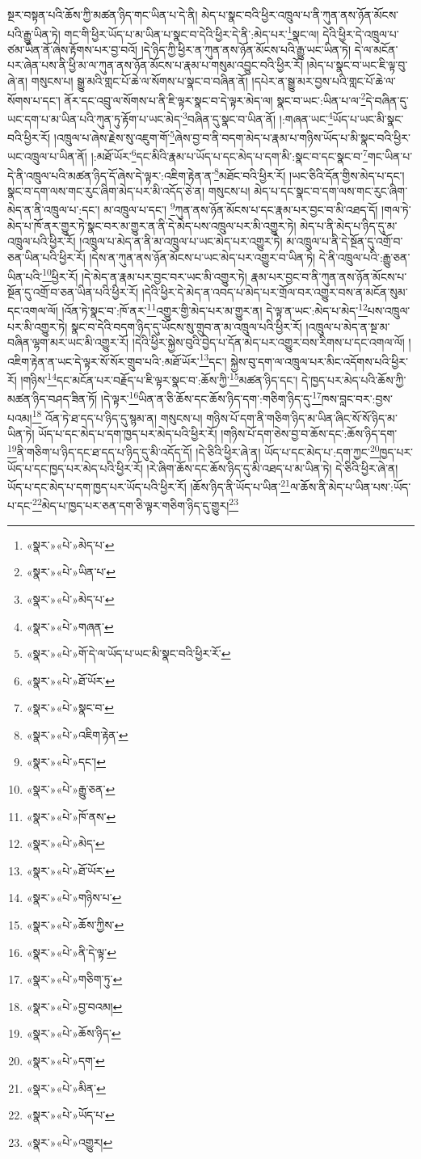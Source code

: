 སྔར་བསྟན་པའི་ཆོས་ཀྱི་མཚན་ཉིད་གང་ཡིན་པ་དེ་ནི། མེད་པ་སྣང་བའི་ཕྱིར་འཁྲུལ་པ་ནི་ཀུན་ནས་ཉོན་མོངས་པའི་རྒྱུ་ཡིན་ཏེ། གང་གི་ཕྱིར་ཡོད་པ་མ་ཡིན་པ་སྣང་བ་དེའི་ཕྱིར་དེ་ནི་:མེད་པར་\footnote{«སྣར་»«པེ་»མེད་པ་}སྣང་ལ། དེའི་ཕྱིར་དེ་འཁྲུལ་པ་ཙམ་ཡིན་ནོ་ཞེས་རྟོགས་པར་བྱ་བའོ། །དེ་ཉིད་ཀྱི་ཕྱིར་ན་ཀུན་ནས་ཉོན་མོངས་པའི་རྒྱུ་ཡང་ཡིན་ཏེ། དེ་ལ་མངོན་པར་ཞེན་པས་ནི་ཕྱི་མ་ལ་ཀུན་ནས་ཉོན་མོངས་པ་རྣམ་པ་གསུམ་འབྱུང་བའི་ཕྱིར་རོ། །མེད་པ་སྣང་བ་ཡང་ཇི་ལྟ་བུ་ཞེ་ན། གསུངས་པ། སྒྱུ་མའི་གླང་པོ་ཆེ་ལ་སོགས་པ་སྣང་བ་བཞིན་ནོ། །དཔེར་ན་སྒྱུ་མར་བྱས་པའི་གླང་པོ་ཆེ་ལ་སོགས་པ་དང་། ནོར་དང་འབྲུ་ལ་སོགས་པ་ནི་ཇི་ལྟར་སྣང་བ་དེ་ལྟར་མེད་ལ། སྣང་བ་ཡང་:ཡིན་པ་ལ་\footnote{«སྣར་»«པེ་»ཡིན་པ་}དེ་བཞིན་དུ་ཡང་དག་པ་མ་ཡིན་པའི་ཀུན་ཏུ་རྟོག་པ་ཡང་མེད་\footnote{«སྣར་»«པེ་»མེད་པ་}བཞིན་དུ་སྣང་བ་ཡིན་ནོ། །:གཞན་ཡང་\footnote{«སྣར་»«པེ་»གཞན་}ཡོད་པ་ཡང་མི་སྣང་བའི་ཕྱིར་རོ། །འཁྲུལ་པ་ཞེས་རྗེས་སུ་འཇུག་གོ་\footnote{«སྣར་»«པེ་»གོ་དེ་ལ་ཡོད་པ་ཡང་མི་སྣང་བའི་ཕྱིར་རོ་}ཞེས་བྱ་བ་ནི་བདག་མེད་པ་རྣམ་པ་གཉིས་ཡོད་པ་མི་སྣང་བའི་ཕྱིར་ཡང་འཁྲུལ་པ་ཡིན་ནོ། །:མཐོ་ཡོར་\footnote{«སྣར་»«པེ་»ཐོ་ཡོར་}དང་མིའི་རྣམ་པ་ཡོད་པ་དང་མེད་པ་དག་མི་:སྣང་བ་དང་སྣང་བ་\footnote{«སྣར་»«པེ་»སྣང་བ་}གང་ཡིན་པ་དེ་ནི་འཁྲུལ་པའི་མཚན་ཉིད་དོ་ཞེས་དེ་ལྟར་:འཇིག་རྟེན་ན་\footnote{«སྣར་»«པེ་»འཇིག་རྟེན་}མཐོང་བའི་ཕྱིར་རོ། །ཡང་ཅིའི་དོན་གྱིས་མེད་པ་དང་། སྣང་བ་དག་ལས་གང་རུང་ཞིག་མེད་པར་མི་འདོད་ཅེ་ན། གསུངས་པ། མེད་པ་དང་སྣང་བ་དག་ལས་གང་རུང་ཞིག་མེད་ན་ནི་འཁྲུལ་པ་:དང་། མ་འཁྲུལ་པ་དང་། \footnote{«སྣར་»«པེ་»དང་།  }ཀུན་ནས་ཉོན་མོངས་པ་དང་རྣམ་པར་བྱང་བ་མི་འཐད་དོ། །གལ་ཏེ་མེད་པ་ཁོ་ནར་གྱུར་ཏེ་སྣང་བར་མ་གྱུར་ན་ནི་དེ་མེད་པས་འཁྲུལ་པར་མི་འགྱུར་ཏེ། མེད་པ་ནི་མེད་པ་ཉིད་དུ་མ་འཁྲུལ་པའི་ཕྱིར་རོ། །འཁྲུལ་པ་མེད་ན་ནི་མ་འཁྲུལ་པ་ཡང་མེད་པར་འགྱུར་ཏེ། མ་འཁྲུལ་པ་ནི་དེ་སྔོན་དུ་འགྲོ་བ་ཅན་ཡིན་པའི་ཕྱིར་རོ། །དེས་ན་ཀུན་ནས་ཉོན་མོངས་པ་ཡང་མེད་པར་འགྱུར་བ་ཡིན་ཏེ། དེ་ནི་འཁྲུལ་པའི་:རྒྱུ་ཅན་ཡིན་པའི་\footnote{«སྣར་»«པེ་»རྒྱུ་ཅན་}ཕྱིར་རོ། །དེ་མེད་ན་རྣམ་པར་བྱང་བར་ཡང་མི་འགྱུར་ཏེ། རྣམ་པར་བྱང་བ་ནི་ཀུན་ནས་ཉོན་མོངས་པ་སྔོན་དུ་འགྲོ་བ་ཅན་ཡིན་པའི་ཕྱིར་རོ། །དེའི་ཕྱིར་དེ་མེད་ན་འབད་པ་མེད་པར་གྲོལ་བར་འགྱུར་བས་ན་མངོན་སུམ་དང་འགལ་ལོ། །འོན་ཏེ་སྣང་བ་:ཁོ་ནར་\footnote{«སྣར་»«པེ་»ཁོ་ནས་}འགྱུར་གྱི་མེད་པར་མ་གྱུར་ན། དེ་ལྟ་ན་ཡང་:མེད་པ་མེད་\footnote{«སྣར་»«པེ་»མེད་}པས་འཁྲུལ་པར་མི་འགྱུར་ཏེ། སྣང་བ་དེའི་བདག་ཉིད་དུ་ཡོངས་སུ་གྲུབ་ན་མ་འཁྲུལ་པའི་ཕྱིར་རོ། །འཁྲུལ་པ་མེད་ན་སྔ་མ་བཞིན་ལྷག་མར་ཡང་མི་འགྱུར་རོ། །དེའི་ཕྱིར་སྐྱེས་བུའི་བྱེད་པ་དོན་མེད་པར་འགྱུར་བས་རིགས་པ་དང་འགལ་ལོ། །འཇིག་རྟེན་ན་ཡང་དེ་ལྟར་སོ་སོར་གྲུབ་པའི་:མཐོ་ཡོར་\footnote{«སྣར་»«པེ་»ཐོ་ཡོར་}དང་། སྐྱེས་བུ་དག་ལ་འཁྲུལ་པར་མིང་འདོགས་པའི་ཕྱིར་རོ། །གཉིས་\footnote{«སྣར་»«པེ་»གཉིས་པ་}དང་མངོན་པར་བརྗོད་པ་ཇི་ལྟར་སྣང་བ་:ཆོས་ཀྱི་\footnote{«སྣར་»«པེ་»ཆོས་ཀྱིས་}མཚན་ཉིད་དང་། དེ་ཁྱད་པར་མེད་པའི་ཆོས་ཀྱི་མཚན་ཉིད་བཤད་ཟིན་ཏོ། །དེ་ལྟར་\footnote{«སྣར་»«པེ་»ནི་དེ་ལྟ་}ཡིན་ན་ཅི་ཆོས་དང་ཆོས་ཉིད་དག་:གཅིག་ཉིད་དུ་\footnote{«སྣར་»«པེ་»གཅིག་ཏུ་}ཁས་བླང་བར་:བྱས་པའམ།\footnote{«སྣར་»«པེ་»བྱ་བའམ།} འོན་ཏེ་ཐ་དད་པ་ཉིད་དུ་སྙམ་ན། གསུངས་པ། གཉིས་པོ་དག་ནི་གཅིག་ཉིད་མ་ཡིན་ཞིང་སོ་སོ་ཉིད་མ་ཡིན་ཏེ། ཡོད་པ་དང་མེད་པ་དག་ཁྱད་པར་མེད་པའི་ཕྱིར་རོ། །གཉིས་པོ་དག་ཅེས་བྱ་བ་ཆོས་དང་:ཆོས་ཉིད་དག་\footnote{«སྣར་»«པེ་»ཆོས་ཉིད་}ནི་གཅིག་པ་ཉིད་དང་ཐ་དད་པ་ཉིད་དུ་མི་འདོད་དོ། །དེ་ཅིའི་ཕྱིར་ཞེ་ན། ཡོད་པ་དང་མེད་པ་:དག་ཀྱང་\footnote{«སྣར་»«པེ་»དག་}ཁྱད་པར་ཡོད་པ་དང་ཁྱད་པར་མེད་པའི་ཕྱིར་རོ། །རེ་ཞིག་ཆོས་དང་ཆོས་ཉིད་དུ་མི་འཐད་པ་མ་ཡིན་ཏེ། དེ་ཅིའི་ཕྱིར་ཞེ་ན། ཡོད་པ་དང་མེད་པ་དག་ཁྱད་པར་ཡོད་པའི་ཕྱིར་རོ། །ཆོས་ཉིད་ནི་ཡོད་པ་ཡིན་\footnote{«སྣར་»«པེ་»མིན་}ལ་ཆོས་ནི་མེད་པ་ཡིན་པས་:ཡོད་པ་དང་\footnote{«སྣར་»«པེ་»ཡོད་པ་}མེད་པ་ཁྱད་པར་ཅན་དག་ཅི་ལྟར་གཅིག་ཉིད་དུ་གྱུར།\footnote{«སྣར་»«པེ་»འགྱུར།} 
